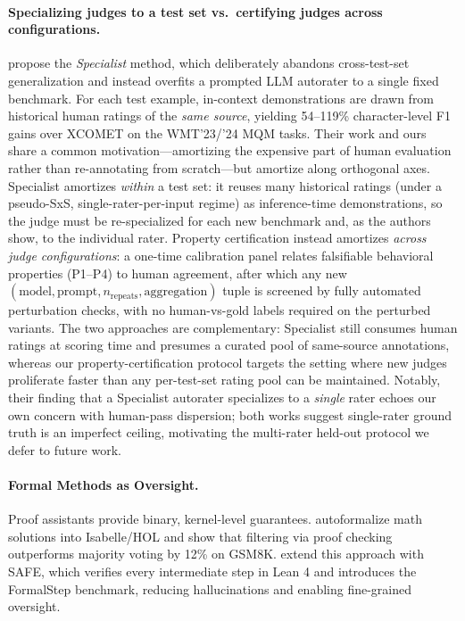 \documentclass{article}
\begin{document}
\paragraph{Specializing judges to a test set vs.\ certifying judges across configurations.}
\citet{finkelstein2024specialist} propose the \emph{Specialist} method, which deliberately abandons cross-test-set generalization and instead overfits a prompted LLM autorater to a single fixed benchmark.
For each test example, in-context demonstrations are drawn from historical human ratings of the \emph{same source}, yielding 54--119\% character-level F1 gains over \textsc{XCOMET} on the WMT'23/'24 MQM tasks.
Their work and ours share a common motivation---amortizing the expensive part of human evaluation rather than re-annotating from scratch---but amortize along orthogonal axes.
Specialist amortizes \emph{within} a test set: it reuses many historical ratings (under a pseudo-SxS, single-rater-per-input regime) as inference-time demonstrations, so the judge must be re-specialized for each new benchmark and, as the authors show, to the individual rater.
Property certification instead amortizes \emph{across judge configurations}: a one-time calibration panel relates falsifiable behavioral properties (P1--P4) to human agreement, after which any new $(\text{model},\text{prompt},n_\text{repeats},\text{aggregation})$ tuple is screened by fully automated perturbation checks, with no human-vs-gold labels required on the perturbed variants.
The two approaches are complementary: Specialist still consumes human ratings at scoring time and presumes a curated pool of same-source annotations, whereas our property-certification protocol targets the setting where new judges proliferate faster than any per-test-set rating pool can be maintained.
Notably, their finding that a Specialist autorater specializes to a \emph{single} rater echoes our own concern with human-pass dispersion; both works suggest single-rater ground truth is an imperfect ceiling, motivating the multi-rater held-out protocol we defer to future work.

\paragraph{Formal Methods as Oversight.}
Proof assistants provide binary, kernel-level guarantees. \citet{zhou2024donttrustverify} autoformalize math solutions into Isabelle/HOL and show that filtering via proof checking outperforms majority voting by 12\% on GSM8K. \citet{liu2025safe} extend this approach with SAFE, which verifies every intermediate step in Lean 4 and introduces the FormalStep benchmark, reducing hallucinations and enabling fine-grained oversight.
\end{document}
